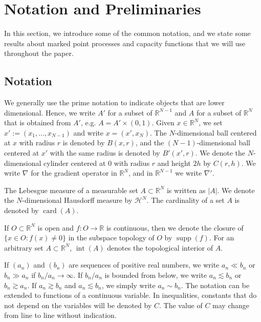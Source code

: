 \documentclass{article}
\numberwithin{equation}{section}
\theoremstyle{definition}
\theoremstyle{remark}
\newcommand{\card}{\operatorname{card}}
\newcommand{\supp}{\operatorname{supp}}
\newcommand{\topint}{\operatorname{int}}
\begin{document}
\section{Notation and Preliminaries} \label{sec:preliminaries}

In this section, we introduce some of the common notation, and we state some results about marked point processes and capacity functions that we will use throughout the paper.

\subsection{Notation}

We generally use the prime notation to indicate objects that are lower dimensional. Hence, we write $A'$ for a subset of $\mathbb{R}^{N - 1}$ and $A$ for a subset of $\mathbb{R}^N$ that is obtained from $A'$, e.g. $A = A' \times (0, 1)$. Given $x \in \mathbb{R}^N$, we set $x' := (x_1, \dots, x_{N - 1})$ and write $x = (x', x_N)$. The $N$-dimensional ball centered at $x$ with radius $r$ is denoted by $B(x, r)$, and the $(N - 1)$-dimensional ball centered at $x'$ with the same radius is denoted by $B'(x', r)$. We denote the $N$-dimensional cylinder centered at $0$ with radius $r$ and height $2h$ by $C(r, h)$. We write $\nabla$ for the gradient operator in $\mathbb{R}^N$, and in $\mathbb{R}^{N - 1}$ we write $\nabla'$.

The Lebesgue measure of a measurable set $A \subset \mathbb{R}^N$ is written as $|A|$. We denote the $N$-dimensional Hausdorff measure by $\mathcal{H}^N$. The cardinality of a set $A$ is denoted by $\card(A)$.

If $O \subset \mathbb{R}^N$ is open and $f : O \rightarrow \mathbb{R}$ is continuous, then we denote the closure of $\{x \in O : f(x) \neq 0\}$ in the subspace topology of $O$ by $\supp(f)$. For an arbitrary set $A \subset \mathbb{R}^N$, $\topint(A)$ denotes the topological interior of $A$.

If $(a_n)$ and $(b_n)$ are sequences of positive real numbers, we write $a_n \ll b_n$ or $b_n \gg a_n$ if $b_n/a_n \to \infty$. If $b_n/a_n$ is bounded from below, we write $a_n \lesssim b_n$ or $b_n \gtrsim a_n$. If $a_n \gtrsim b_n$ and $a_n \lesssim b_n$, we simply write $a_n \sim b_n$. The notation can be extended to functions of a continuous variable. In inequalities, constants that do not depend on the variables will be denoted by $C$. The value of $C$ may change from line to line without indication.
\end{document}
